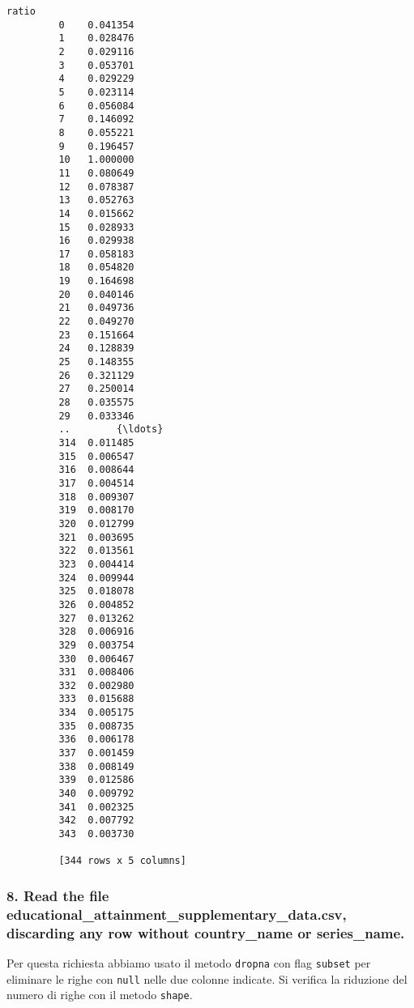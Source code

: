 \documentclass[11pt]{article}
\begin{document}
\begin{Verbatim}[commandchars=\\\{\}]
                 ratio  
         0    0.041354  
         1    0.028476  
         2    0.029116  
         3    0.053701  
         4    0.029229  
         5    0.023114  
         6    0.056084  
         7    0.146092  
         8    0.055221  
         9    0.196457  
         10   1.000000  
         11   0.080649  
         12   0.078387  
         13   0.052763  
         14   0.015662  
         15   0.028933  
         16   0.029938  
         17   0.058183  
         18   0.054820  
         19   0.164698  
         20   0.040146  
         21   0.049736  
         22   0.049270  
         23   0.151664  
         24   0.128839  
         25   0.148355  
         26   0.321129  
         27   0.250014  
         28   0.035575  
         29   0.033346  
         ..        {\ldots}  
         314  0.011485  
         315  0.006547  
         316  0.008644  
         317  0.004514  
         318  0.009307  
         319  0.008170  
         320  0.012799  
         321  0.003695  
         322  0.013561  
         323  0.004414  
         324  0.009944  
         325  0.018078  
         326  0.004852  
         327  0.013262  
         328  0.006916  
         329  0.003754  
         330  0.006467  
         331  0.008406  
         332  0.002980  
         333  0.015688  
         334  0.005175  
         335  0.008735  
         336  0.006178  
         337  0.001459  
         338  0.008149  
         339  0.012586  
         340  0.009792  
         341  0.002325  
         342  0.007792  
         343  0.003730  
         
         [344 rows x 5 columns]
\end{Verbatim}
            
    \hypertarget{read-the-file-educational_attainment_supplementary_data.csv-discarding-any-row-without-country_name-or-series_name.}{%
\subsubsection{8. Read the file
educational\_attainment\_supplementary\_data.csv, discarding any row
without country\_name or
series\_name.}\label{read-the-file-educational_attainment_supplementary_data.csv-discarding-any-row-without-country_name-or-series_name.}}

    Per questa richiesta abbiamo usato il metodo \texttt{dropna} con flag
\texttt{subset} per eliminare le righe con \texttt{null} nelle due
colonne indicate. Si verifica la riduzione del numero di righe con il
metodo \texttt{shape}.
\end{document}
